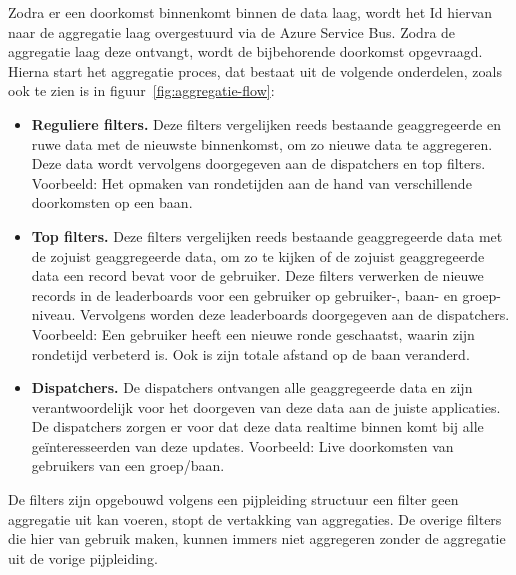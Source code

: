 Zodra er een doorkomst binnenkomt binnen de data laag, wordt het Id hiervan naar de aggregatie laag overgestuurd via de Azure Service Bus. Zodra de aggregatie laag deze ontvangt, wordt de bijbehorende doorkomst opgevraagd. Hierna start het aggregatie proces, dat bestaat uit de volgende onderdelen, zoals ook te zien is in figuur~\ref{fig:aggregatie-flow}:

\begin{itemize}
\item \textbf{Reguliere filters.}
Deze filters vergelijken reeds bestaande geaggregeerde en ruwe data met de nieuwste binnenkomst, om zo nieuwe data te aggregeren. Deze data wordt vervolgens doorgegeven aan de dispatchers en top filters. Voorbeeld: Het opmaken van rondetijden aan de hand van verschillende doorkomsten op een baan.
\item \textbf{Top filters.}
Deze filters vergelijken reeds bestaande geaggregeerde data met de zojuist geaggregeerde data, om zo te kijken of de zojuist geaggregeerde data een record bevat voor de gebruiker. Deze filters verwerken de nieuwe records in de leaderboards voor een gebruiker op gebruiker-, baan- en groep-niveau. Vervolgens worden deze leaderboards doorgegeven aan de dispatchers. Voorbeeld: Een gebruiker heeft een nieuwe ronde geschaatst, waarin zijn rondetijd verbeterd is. Ook is zijn totale afstand op de baan veranderd. 
\item \textbf{Dispatchers.}
De dispatchers ontvangen alle geaggregeerde data en zijn verantwoordelijk voor het doorgeven van deze data aan de juiste applicaties. De dispatchers zorgen er voor dat deze data realtime binnen komt bij alle geïnteresseerden van deze updates. 
Voorbeeld: Live doorkomsten van gebruikers van een groep/baan. 
\end{itemize}

De filters zijn opgebouwd volgens een pijpleiding structuur een filter geen aggregatie uit kan voeren, stopt de vertakking van aggregaties. De overige filters die hier van gebruik maken, kunnen immers niet aggregeren zonder de aggregatie uit de vorige pijpleiding.

